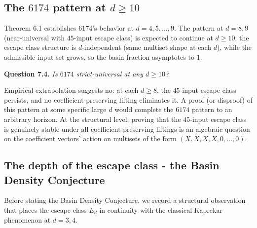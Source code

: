 \documentclass[11pt,letterpaper]{article}
\theoremstyle{paperstyle}
\theoremstyle{paperstyledef}
\theoremstyle{paperstylerem}
\begin{document}
\hypertarget{the-6174-pattern-at-d-geq-10}{%
\subsection{\texorpdfstring{The \(6174\) pattern at \(d \geq 10\)}{The 6174 pattern at d \textbackslash geq 10}}\label{the-6174-pattern-at-d-geq-10}}

Theorem 6.1 establishes \(6174\)'s behavior at \(d = 4, 5, \ldots, 9\).
The pattern at \(d = 8, 9\) (near-universal with \(45\)-input escape
class) is expected to continue at \(d \geq 10\): the escape class
structure is \(d\)-independent (same multiset shape at each \(d\)),
while the admissible input set grows, so the basin fraction asymptotes
to \(1\).

\textbf{Question 7.4.} \emph{Is \(6174\) strict-universal at any
\(d \geq 10\)?}

Empirical extrapolation suggests no: at each \(d \geq 8\), the
\(45\)-input escape class persists, and no coefficient-preserving
lifting eliminates it. A proof (or disproof) of this pattern at some
specific large \(d\) would complete the \(6174\) pattern to an arbitrary
horizon. At the structural level, proving that the \(45\)-input escape
class is genuinely stable under all coefficient-preserving liftings is
an algebraic question on the coefficient vectors' action on multisets of
the form \((X, X, X, X, 0, \ldots, 0)\).

\hypertarget{the-depth-of-the-escape-class-the-basin-density-conjecture}{%
\subsection{The depth of the escape class - the Basin Density Conjecture}\label{the-depth-of-the-escape-class-the-basin-density-conjecture}}

Before stating the Basin Density Conjecture, we record a structural
observation that places the escape class \(E_d\) in continuity with the
classical Kaprekar phenomenon at \(d = 3, 4\).
\end{document}
